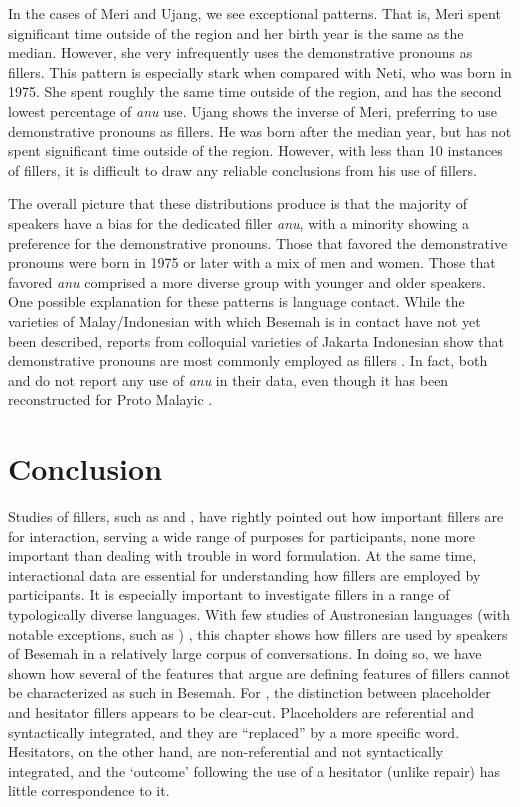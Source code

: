 \documentclass[output=paper,
\ChapterDOI{10.5281/zenodo.15697583}
colorlinks,
citecolor=brown]{langscibook}
\begin{document}
In the cases of Meri and Ujang, we see exceptional patterns. That is, Meri spent significant time outside of the region and her birth year is the same as the median. However, she very infrequently uses the demonstrative pronouns as fillers. This pattern is especially stark when compared with Neti, who was born in 1975. She spent roughly the same time outside of the region, and has the second lowest percentage of \textit{anu} use. Ujang shows the inverse of Meri, preferring to use demonstrative pronouns as fillers. He was born after the median year, but has not spent significant time outside of the region. However, with less than 10 instances of fillers, it is difficult to draw any reliable conclusions from his use of fillers.

The overall picture that these distributions produce is that the majority of speakers have a bias for the dedicated filler \textit{anu}, with a minority showing a preference for the demonstrative pronouns. Those that favored the demonstrative pronouns were born in 1975 or later with a mix of men and women. Those that favored \textit{anu} comprised a more diverse group with younger and older speakers. One possible explanation for these patterns is language contact. While the varieties of Malay/Indonesian with which Besemah is in contact have not yet been described, reports from colloquial varieties of Jakarta Indonesian show that demonstrative pronouns are most commonly employed as fillers \citep{wouk2005syntax,williams2010toward}. In fact, both \textcite{wouk2005syntax} and \textcite{williams2010toward} do not report any use of \textit{anu} in their data, even though it has been reconstructed for Proto Malayic \citep{adelaar1992protomalayic}.

\section{Conclusion}\label{sec:conclusion}
Studies of fillers, such as \textcite{enfield2003definition} and \textcite{hayashi2006crosslinguistic}, have rightly pointed out how important fillers are for interaction, serving a wide range of purposes for participants, none more important than dealing with trouble in word formulation. At the same time, interactional data are essential for understanding how fillers are employed by participants. It is especially important to investigate fillers in a range of typologically diverse languages. With few studies of Austronesian languages (with notable exceptions, such as \cite{nagaya2022tagalog,tanangkingsing2022cebuano}) , this chapter shows how fillers are used by speakers of Besemah in a relatively large corpus of conversations. In doing so, we have shown how several of the features that \citet{hayashi2006crosslinguistic} argue are defining features of fillers cannot be characterized as such in Besemah. For \citet{hayashi2006crosslinguistic}, the distinction between placeholder and hesitator fillers appears to be clear-cut. Placeholders are referential and syntactically integrated, and they are “replaced” by a more specific word. Hesitators, on the other hand, are non-referential and not syntactically integrated, and the `outcome' following the use of a hesitator (unlike repair) has little correspondence to it. 
\end{document}
